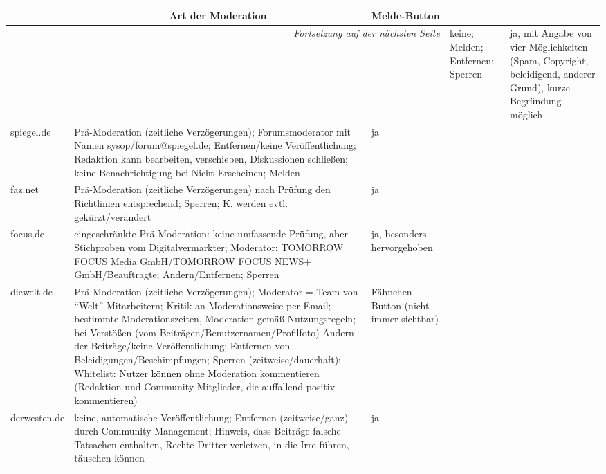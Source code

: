\begin{landscape} \footnotesize
\begin{longtable}{l|p{110mm}p{50mm}}

  \multicolumn{1}{c}{} &
  \multicolumn{1}{c}{Art der Moderation} &
  \multicolumn{1}{c}{Melde-Button} \\\hline\hline
  \endhead

  \hline \multicolumn{3}{r}{\emph{Fortsetzung auf der nächsten Seite}}
  \endfoot

  \hline
  \endlastfoot

bild.de &
  keine; Melden; Entfernen; Sperren &
  ja, mit Angabe von vier Möglichkeiten (Spam, Copyright, beleidigend, anderer
  Grund), kurze Begründung möglich \\\hline

spiegel.de &
  Prä-Moderation (zeitliche Verzögerungen); Forumsmoderator mit Namen
  sysop/forum@spiegel.de; Entfernen/keine Veröffentlichung; Redaktion kann
  bearbeiten, verschieben, Diskussionen schließen; keine Benachrichtigung bei
  Nicht-Erscheinen; Melden &
  ja \\\hline

faz.net &
  Prä-Moderation (zeitliche Verzögerungen) nach Prüfung den Richtlinien
  entsprechend; Sperren; K. werden evtl. gekürzt/verändert &
  ja \\\hline

focus.de &
  eingeschränkte Prä-Moderation: keine umfassende Prüfung, aber Stichproben vom
  Digitalvermarkter; Moderator: TOMORROW FOCUS Media GmbH/TOMORROW FOCUS NEWS+
  GmbH/Beauftragte; Ändern/Entfernen; Sperren &
  ja, besonders hervorgehoben \\\hline

diewelt.de &
  Prä-Moderation (zeitliche Verzögerungen); Moderator = Team von
  ``Welt''-Mitarbeitern; Kritik an Moderationsweise per Email; bestimmte
  Moderationszeiten, Moderation gemäß Nutzungsregeln; bei Verstößen (vom
  Beiträgen/Benutzernamen/Profilfoto) Ändern der Beiträge/keine
  Veröffentlichung; Entfernen von Beleidigungen/Beschimpfungen; Sperren
  (zeitweise/dauerhaft); Whitelist: Nutzer können ohne Moderation kommentieren
  (Redaktion und Community-Mitglieder, die auffallend positiv kommentieren) &
  Fähnchen-Button (nicht immer sichtbar) \\\hline

derwesten.de &
  keine, automatische Veröffentlichung; Entfernen (zeitweise/ganz) durch
  Community Management; Hinweis, dass Beiträge falsche Tatsachen enthalten,
  Rechte Dritter verletzen, in die Irre führen, täuschen können &
  ja \\\hline


\end{longtable}
\end{landscape}
